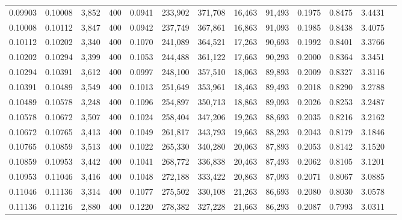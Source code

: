 \begin{tabular}{rrrrrrrrrrrrr}
0.09903 & 0.10008 &  3,852 & 400 &                                     0.0941 & 233,902 & 371,708 &  16,463 &  91,493 & 0.1975 & 0.8475 & 3.4431 \\
0.10008 & 0.10112 &  3,847 & 400 &                                     0.0942 & 237,749 & 367,861 &  16,863 &  91,093 & 0.1985 & 0.8438 & 3.4075 \\
0.10112 & 0.10202 &  3,340 & 400 &                                     0.1070 & 241,089 & 364,521 &  17,263 &  90,693 & 0.1992 & 0.8401 & 3.3766 \\
0.10202 & 0.10294 &  3,399 & 400 &                                     0.1053 & 244,488 & 361,122 &  17,663 &  90,293 & 0.2000 & 0.8364 & 3.3451 \\
0.10294 & 0.10391 &  3,612 & 400 &                                     0.0997 & 248,100 & 357,510 &  18,063 &  89,893 & 0.2009 & 0.8327 & 3.3116 \\
0.10391 & 0.10489 &  3,549 & 400 &                                     0.1013 & 251,649 & 353,961 &  18,463 &  89,493 & 0.2018 & 0.8290 & 3.2788 \\
0.10489 & 0.10578 &  3,248 & 400 &                                     0.1096 & 254,897 & 350,713 &  18,863 &  89,093 & 0.2026 & 0.8253 & 3.2487 \\
0.10578 & 0.10672 &  3,507 & 400 &                                     0.1024 & 258,404 & 347,206 &  19,263 &  88,693 & 0.2035 & 0.8216 & 3.2162 \\
0.10672 & 0.10765 &  3,413 & 400 &                                     0.1049 & 261,817 & 343,793 &  19,663 &  88,293 & 0.2043 & 0.8179 & 3.1846 \\
0.10765 & 0.10859 &  3,513 & 400 &                                     0.1022 & 265,330 & 340,280 &  20,063 &  87,893 & 0.2053 & 0.8142 & 3.1520 \\
0.10859 & 0.10953 &  3,442 & 400 &                                     0.1041 & 268,772 & 336,838 &  20,463 &  87,493 & 0.2062 & 0.8105 & 3.1201 \\
0.10953 & 0.11046 &  3,416 & 400 &                                     0.1048 & 272,188 & 333,422 &  20,863 &  87,093 & 0.2071 & 0.8067 & 3.0885 \\
0.11046 & 0.11136 &  3,314 & 400 &                                     0.1077 & 275,502 & 330,108 &  21,263 &  86,693 & 0.2080 & 0.8030 & 3.0578 \\
0.11136 & 0.11216 &  2,880 & 400 &                                     0.1220 & 278,382 & 327,228 &  21,663 &  86,293 & 0.2087 & 0.7993 & 3.0311 \\

\end{tabular}
